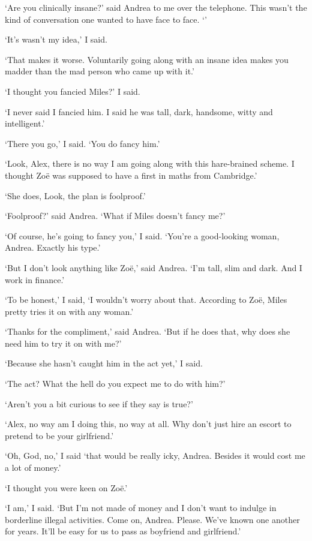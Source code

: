 `Are you clinically insane?' said Andrea to me over the telephone.
This wasn't the kind of conversation one wanted to have face to
face. `'

`It's wasn't my idea,' I said.

`That makes it worse. Voluntarily going along with an insane idea
makes you madder than the mad person who came up with it.'

`I thought you fancied Miles?' I said.

`I never said I fancied him. I said he was tall, dark, handsome,
witty and intelligent.'

`There you go,' I said. `You {\twelveit do\/} fancy him.'

`Look, Alex, there is no way I am going along with this hare-brained
scheme. I thought Zoë was supposed to have a first in maths from
Cambridge.'

`She does, Look, the plan is foolproof.'

`Foolproof?' said Andrea. `What if Miles doesn't fancy me?'

`Of course, he's going to fancy you,' I said. `You're a good-looking
woman, Andrea. Exactly his type.'

`But I don't look anything like Zoë,' said Andrea. `I'm tall,
slim and dark. And I work in finance.'

`To be honest,' I said, `I wouldn't worry about that. According to
Zoë, Miles pretty tries it on with any woman.'

`Thanks for the compliment,' said Andrea. `But if he does that, why
does she need him to try it on with me?'

`Because she hasn't caught him in the act yet,' I said.

`The act? What the hell do you expect me to do with him?'

`Aren't you a bit curious to see if they say is true?'

`Alex, no way am I doing this, no way at all. Why don't just hire an
escort to pretend to be your girlfriend.'

`Oh, God, no,' I said `that would be really icky, Andrea. Besides it
would cost me a lot of money.'

`I thought you were keen on Zoë.'

`I am,' I said. `But I'm not made of money and I don't want to indulge in borderline illegal activities. Come on, Andrea. Please. We've known one another
for years. It'll be easy for us to pass as boyfriend and
girlfriend.'

